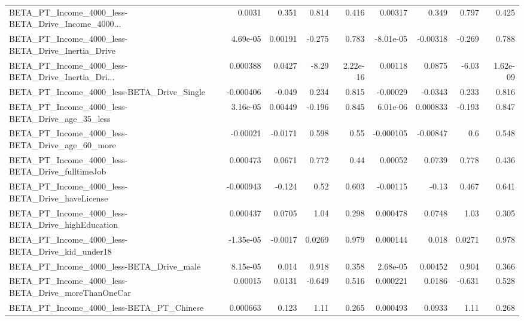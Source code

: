 \begin{tabular}{lrrrrrrrr}
BETA\_PT\_Income\_4000\_less-BETA\_Drive\_Income\_4000... &      0.0031 &        0.351 &    0.814 &    0.416 &    0.00317 &       0.349 &        0.797 &         0.425 \\
BETA\_PT\_Income\_4000\_less-BETA\_Drive\_Inertia\_Drive  &    4.69e-05 &      0.00191 &   -0.275 &    0.783 &  -8.01e-05 &    -0.00318 &       -0.269 &         0.788 \\
BETA\_PT\_Income\_4000\_less-BETA\_Drive\_Inertia\_Dri... &    0.000388 &       0.0427 &    -8.29 & 2.22e-16 &    0.00118 &      0.0875 &        -6.03 &      1.62e-09 \\
BETA\_PT\_Income\_4000\_less-BETA\_Drive\_Single         &   -0.000406 &       -0.049 &    0.234 &    0.815 &   -0.00029 &     -0.0343 &        0.233 &         0.816 \\
BETA\_PT\_Income\_4000\_less-BETA\_Drive\_age\_35\_less    &    3.16e-05 &      0.00449 &   -0.196 &    0.845 &   6.01e-06 &    0.000833 &       -0.193 &         0.847 \\
BETA\_PT\_Income\_4000\_less-BETA\_Drive\_age\_60\_more    &    -0.00021 &      -0.0171 &    0.598 &     0.55 &  -0.000105 &    -0.00847 &          0.6 &         0.548 \\
BETA\_PT\_Income\_4000\_less-BETA\_Drive\_fulltimeJob    &    0.000473 &       0.0671 &    0.772 &     0.44 &    0.00052 &      0.0739 &        0.778 &         0.436 \\
BETA\_PT\_Income\_4000\_less-BETA\_Drive\_haveLicense    &   -0.000943 &       -0.124 &     0.52 &    0.603 &   -0.00115 &       -0.13 &        0.467 &         0.641 \\
BETA\_PT\_Income\_4000\_less-BETA\_Drive\_highEducation  &    0.000437 &       0.0705 &     1.04 &    0.298 &   0.000478 &      0.0748 &         1.03 &         0.305 \\
BETA\_PT\_Income\_4000\_less-BETA\_Drive\_kid\_under18    &   -1.35e-05 &      -0.0017 &   0.0269 &    0.979 &   0.000144 &       0.018 &       0.0271 &         0.978 \\
BETA\_PT\_Income\_4000\_less-BETA\_Drive\_male           &    8.15e-05 &        0.014 &    0.918 &    0.358 &   2.68e-05 &     0.00452 &        0.904 &         0.366 \\
BETA\_PT\_Income\_4000\_less-BETA\_Drive\_moreThanOneCar &     0.00015 &       0.0131 &   -0.649 &    0.516 &   0.000221 &      0.0186 &       -0.631 &         0.528 \\
BETA\_PT\_Income\_4000\_less-BETA\_PT\_Chinese           &    0.000663 &        0.123 &     1.11 &    0.265 &   0.000493 &      0.0933 &         1.11 &         0.268 \\

\end{tabular}

